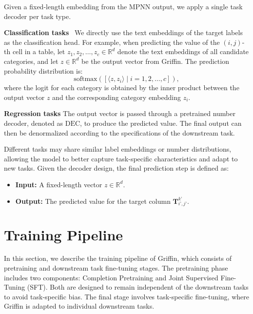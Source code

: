 \documentclass{article}
\theoremstyle{plain}
\theoremstyle{definition}
\theoremstyle{remark}
\begin{document}
Given a fixed-length embedding from the MPNN output, we apply a single task decoder per task type. 

\textbf{Classification tasks}~ We directly use the text embeddings of the target labels as the classification head. For example, when predicting the value of the $(i, j)$-th cell in a table, let $z_1, z_2, \dots, z_c \in \mathbb{R}^d$ denote the text embeddings of all candidate categories, and let $z \in \mathbb{R}^d$ be the output vector from Griffin. The prediction probability distribution is:
\begin{equation}
\text{softmax}([\langle z, z_i \rangle \mid i = 1, 2, \dots, c]),
\end{equation}
where the logit for each category is obtained by the inner product between the output vector $z$ and the corresponding category embedding $z_i$.

\textbf{Regression tasks} The output vector is passed through a pretrained number decoder, denoted as $\text{DEC}$, to produce the predicted value. The final output can then be denormalized according to the specifications of the downstream task.

Different tasks may share similar label embeddings or number distributions, allowing the model to better capture task-specific characteristics and adapt to new tasks. Given the decoder design, the final prediction step is defined as:
\begin{itemize}
[itemsep=2pt,topsep=-2pt,parsep=0pt,leftmargin=10pt]
\item \textbf{Input:} A fixed-length vector $z \in \mathbb{R}^d$.
\item \textbf{Output:} The predicted value for the target column $\bm{T}^{k’}_{i’, j’}$.
\end{itemize}

\section{Training Pipeline}
\label{sec:training-pipeline}
In this section, we describe the training pipeline of Griffin, which consists of pretraining and downstream task fine-tuning stages. The pretraining phase includes two components: Completion Pretraining and Joint Supervised Fine-Tuning (SFT). Both are designed to remain independent of the downstream tasks to avoid task-specific bias. The final stage involves task-specific fine-tuning, where Griffin is adapted to individual downstream tasks.
\end{document}
